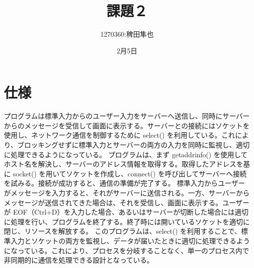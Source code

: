 \documentclass{jlreq}
\title{課題２}
\author{1270360:稗田隼也}
\date{2月5日}
\begin{document}
\maketitle
\section{仕様}
プログラムは標準入力からのユーザー入力をサーバーへ送信し、同時にサーバーからのメッセージを受信して画面に表示する。サーバーとの接続にはソケットを使用し、ネットワーク通信を制御するために select() を利用している。これにより、ブロッキングせずに標準入力とサーバーの両方の入力を同時に監視し、適切に処理できるようになっている。
プログラムは、まず getaddrinfo() を使用してホスト名を解決し、サーバーのアドレス情報を取得する。取得したアドレスを基に socket() を用いてソケットを作成し、connect() を呼び出してサーバーへ接続を試みる。接続が成功すると、通信の準備が完了する。
標準入力からユーザーがメッセージを入力すると、それがサーバーに送信される。一方、サーバーからメッセージが送信されてきた場合は、それを受信し、画面に表示する。ユーザーが EOF（Ctrl+D）を入力した場合、あるいはサーバーが切断した場合には適切に処理を行い、プログラムを終了する。終了時には開いているソケットを適切に閉じ、リソースを解放する。
このプログラムは、select() を利用することで、標準入力とソケットの両方を監視し、データが届いたときに適切に処理できるようになっている。これにより、プロセスを分岐することなく、単一のプロセス内で非同期的に通信を処理できる設計となっている。
\end{document}
